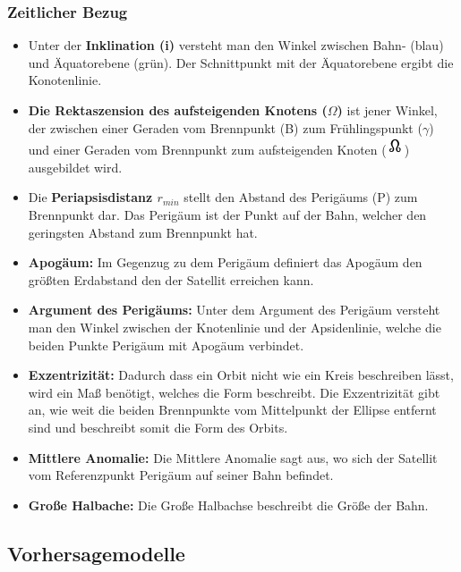 \subsubsection*{Zeitlicher Bezug}
\begin{itemize}
	
	\item Unter der \textbf{Inklination (i)} versteht man den Winkel zwischen 
	Bahn- (blau) und Äquatorebene (grün). Der Schnittpunkt mit der Äquatorebene ergibt die
	Konotenlinie. 
	\item \textbf{Die Rektaszension des aufsteigenden Knotens (\ensuremath{\Omega})} ist jener Winkel, der zwischen einer Geraden vom Brennpunkt (B) zum Frühlingspunkt (\ensuremath{\gamma}) und einer Geraden vom Brennpunkt zum aufsteigenden Knoten (\includegraphics[scale=1.5]{./images/anode.png}) ausgebildet wird.  
	\item Die \textbf{Periapsisdistanz \ensuremath{r_{min}}} stellt den Abstand des Perigäums (P) zum Brennpunkt dar. Das Perigäum ist der Punkt auf der Bahn, welcher den geringsten Abstand zum Brennpunkt hat.
	\item \textbf{Apogäum:} Im Gegenzug zu dem Perigäum definiert das Apogäum 
	den größten Erdabstand den der Satellit erreichen kann.
	\item \textbf{Argument des Perigäums:} Unter dem Argument des Perigäum 
	versteht man den Winkel zwischen der Knotenlinie und der Apsidenlinie, welche 
	die beiden Punkte Perigäum mit Apogäum verbindet.
	\item \textbf{Exzentrizität:} Dadurch dass ein Orbit nicht wie ein Kreis 
	beschreiben lässt, wird ein Maß benötigt, welches die Form beschreibt. Die 
	Exzentrizität gibt an, wie weit die beiden Brennpunkte vom Mittelpunkt der 
	Ellipse entfernt sind und beschreibt somit die Form des Orbits.
	\item \textbf{Mittlere Anomalie:} Die Mittlere Anomalie sagt aus, wo sich 
	der Satellit vom Referenzpunkt Perigäum auf seiner Bahn befindet.
	\item \textbf{Große Halbache:} Die Große Halbachse beschreibt die Größe der
	Bahn.
	
\end{itemize}

\subsection{Vorhersagemodelle}

\clearpage